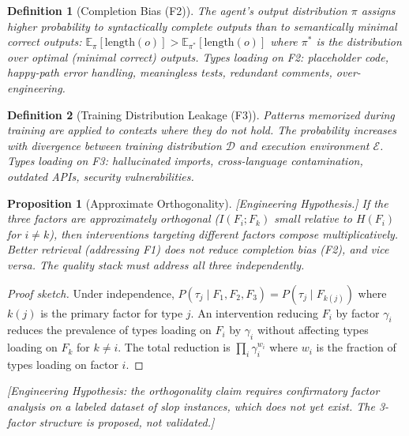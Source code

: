 \documentclass[11pt, a4paper, copyright]{googledeepmind}
\newtheorem{definition}{Definition}[section]
\newtheorem{proposition}{Proposition}[section]
\newcommand{\E}{\mathbb{E}}
\begin{document}
\begin{definition}[Completion Bias (F2)]
\label{def:f2}
The agent's output distribution $\pi$ assigns higher probability to syntactically complete outputs than to semantically minimal correct outputs: $\E_\pi[\mathrm{length}(o)] > \E_{\pi^*}[\mathrm{length}(o)]$ where $\pi^*$ is the distribution over optimal (minimal correct) outputs. Types loading on F2: placeholder code, happy-path error handling, meaningless tests, redundant comments, over-engineering.
\end{definition}

\begin{definition}[Training Distribution Leakage (F3)]
\label{def:f3}
Patterns memorized during training are applied to contexts where they do not hold. The probability increases with divergence between training distribution $\mathcal{D}$ and execution environment $\mathcal{E}$. Types loading on F3: hallucinated imports, cross-language contamination, outdated APIs, security vulnerabilities.
\end{definition}

\begin{proposition}[Approximate Orthogonality]
\label{prop:orthogonality}
\emph{[Engineering Hypothesis.]} If the three factors are approximately orthogonal ($I(F_i; F_k)$ small relative to $H(F_i)$ for $i \neq k$), then interventions targeting different factors compose multiplicatively. Better retrieval (addressing F1) does not reduce completion bias (F2), and vice versa. The quality stack must address all three independently.
\end{proposition}

\begin{proof}[Proof sketch]
Under independence, $P(\tau_j \mid F_1, F_2, F_3) = P(\tau_j \mid F_{k(j)})$ where $k(j)$ is the primary factor for type $j$. An intervention reducing $F_i$ by factor $\gamma_i$ reduces the prevalence of types loading on $F_i$ by $\gamma_i$ without affecting types loading on $F_k$ for $k \neq i$. The total reduction is $\prod_i \gamma_i^{w_i}$ where $w_i$ is the fraction of types loading on factor $i$.
\end{proof}

\emph{[Engineering Hypothesis: the orthogonality claim requires confirmatory factor analysis on a labeled dataset of slop instances, which does not yet exist. The 3-factor structure is proposed, not validated.]}


\end{document}
